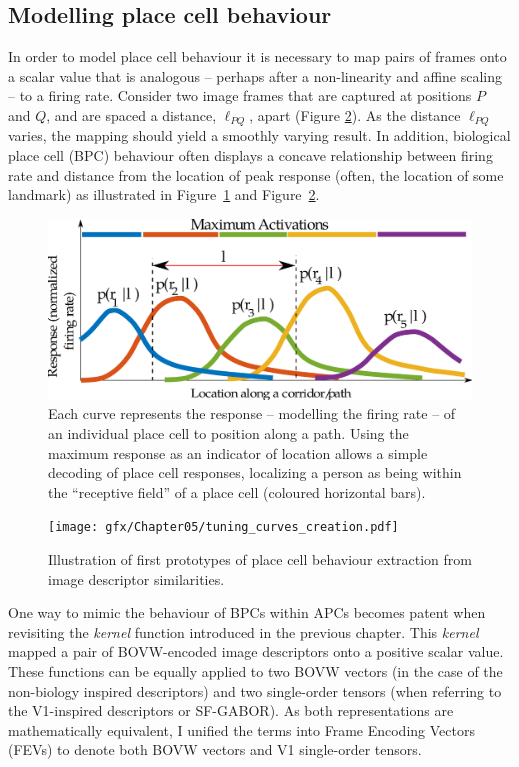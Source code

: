 \subsection{Modelling place cell behaviour}
\label{sec:kerneltoAPC}
In order to model place cell behaviour it is necessary to map pairs of frames onto a scalar value that is analogous -- perhaps after a non-linearity and affine scaling -- to a firing rate. Consider two image frames that are captured at positions $P$ and $Q$, and are spaced a distance, $\ell_{PQ}$, apart (Figure \ref{fig:creatingAPCs}). As the distance $\ell_{PQ}$ varies, the mapping should yield a smoothly varying result. In addition, biological place cell (BPC) behaviour often displays a concave relationship between firing rate and distance from the location of peak response (often, the location of some landmark) as illustrated in Figure~\ref{fig:APCresponses} and Figure~\ref{fig:creatingAPCs}.


\begin{figure}
\includegraphics[width=\textwidth]{gfx/Chapter05/APCResponses.pdf}
\caption{Each curve represents the response -- modelling the firing rate -- of an individual place cell to position along a path. Using the maximum response as an indicator of location allows a simple decoding of place cell responses, localizing a person as being within the ``receptive field'' of a place cell (coloured horizontal bars).}
\label{fig:APCresponses}
\end{figure}


\begin{figure}
\texttt{[image: gfx/Chapter05/tuning\_curves\_creation.pdf]}
\caption{Illustration of first prototypes of place cell behaviour extraction from image descriptor similarities.}
\label{fig:creatingAPCs}
\end{figure}


One way to mimic the behaviour of BPCs within APCs becomes patent when revisiting the \textit{kernel} function introduced in the previous chapter. This \textit{kernel} mapped a pair of BOVW-encoded image descriptors onto a positive scalar value. These functions can be equally applied to two BOVW vectors (in the case of the non-biology inspired descriptors) and two single-order tensors (when referring to the V1-inspired descriptors or SF-GABOR). As both representations are mathematically equivalent, I unified the terms into Frame Encoding Vectors (FEVs) to denote both BOVW vectors and V1 single-order tensors.

